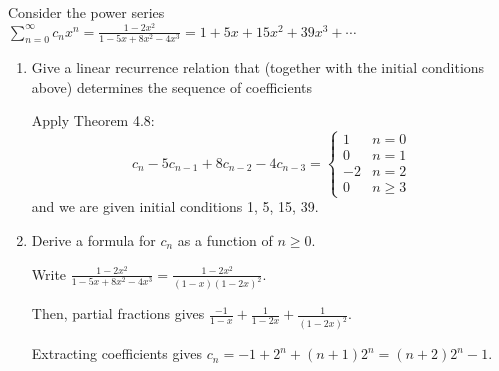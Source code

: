 \documentclass[class=math239,notes]{agony}
\begin{document}
\begin{xca}
  Consider the power series $\sum_{n=0}^\infty c_n x^n
    = \frac{1-2x^2}{1-5x+8x^2-4x^3}
    = 1 + 5x + 15x^2 + 39x^3 + \dotsb$
\end{xca}
\begin{enumerate}
  \item Give a linear recurrence relation that
        (together with the initial conditions above)
        determines the sequence of coefficients
        \begin{sol}
          Apply Theorem 4.8:
          \[
            c_n - 5c_{n-1} + 8c_{n-2} - 4c_{n-3} = \begin{cases}
              1  & n = 0    \\
              0  & n = 1    \\
              -2 & n = 2    \\
              0  & n \geq 3
            \end{cases}
          \]
          and we are given initial conditions 1, 5, 15, 39.
        \end{sol}
  \item Derive a formula for $c_n$ as a function of $n \geq 0$.
        \begin{sol}
          Write $\frac{1-2x^2}{1-5x+8x^2-4x^3} = \frac{1-2x^2}{(1-x)(1-2x)^2}$.

          Then, partial fractions gives $\frac{-1}{1-x} + \frac{1}{1-2x} + \frac{1}{(1-2x)^2}$.

          Extracting coefficients gives $c_n = -1 + 2^n + (n+1)2^n = (n+2)2^n - 1$.
        \end{sol}
\end{enumerate}
\end{document}
